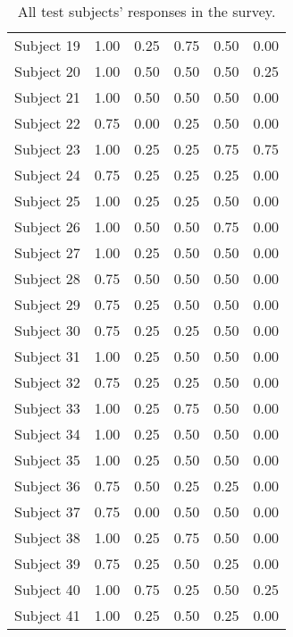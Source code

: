 \begin{table}[!htp]
{\begin{tabular}{l||c|c|c|c|c}
Subject 19 & 1.00 & 0.25 & 0.75 & 0.50 & 0.00 \\
Subject 20 & 1.00 & 0.50 & 0.50 & 0.50 & 0.25 \\
Subject 21 & 1.00 & 0.50 & 0.50 & 0.50 & 0.00 \\
Subject 22 & 0.75 & 0.00 & 0.25 & 0.50 & 0.00 \\
Subject 23 & 1.00 & 0.25 & 0.25 & 0.75 & 0.75 \\
Subject 24 & 0.75 & 0.25 & 0.25 & 0.25 & 0.00 \\
Subject 25 & 1.00 & 0.25 & 0.25 & 0.50 & 0.00 \\
Subject 26 & 1.00 & 0.50 & 0.50 & 0.75 & 0.00 \\
Subject 27 & 1.00 & 0.25 & 0.50 & 0.50 & 0.00 \\
Subject 28 & 0.75 & 0.50 & 0.50 & 0.50 & 0.00 \\
Subject 29 & 0.75 & 0.25 & 0.50 & 0.50 & 0.00 \\
Subject 30 & 0.75 & 0.25 & 0.25 & 0.50 & 0.00 \\
Subject 31 & 1.00 & 0.25 & 0.50 & 0.50 & 0.00 \\
Subject 32 & 0.75 & 0.25 & 0.25 & 0.50 & 0.00 \\
Subject 33 & 1.00 & 0.25 & 0.75 & 0.50 & 0.00 \\
Subject 34 & 1.00 & 0.25 & 0.50 & 0.50 & 0.00 \\
Subject 35 & 1.00 & 0.25 & 0.50 & 0.50 & 0.00 \\
Subject 36 & 0.75 & 0.50 & 0.25 & 0.25 & 0.00 \\
Subject 37 & 0.75 & 0.00 & 0.50 & 0.50 & 0.00 \\
Subject 38 & 1.00 & 0.25 & 0.75 & 0.50 & 0.00 \\
Subject 39 & 0.75 & 0.25 & 0.50 & 0.25 & 0.00 \\
Subject 40 & 1.00 & 0.75 & 0.25 & 0.50 & 0.25 \\
Subject 41 & 1.00 & 0.25 & 0.50 & 0.25 & 0.00 \\
\end{tabular}
}
\caption[Survey: Raw Data]{All test subjects' responses in the survey.}
\label{tab:survey_ttest}
\end{table}
